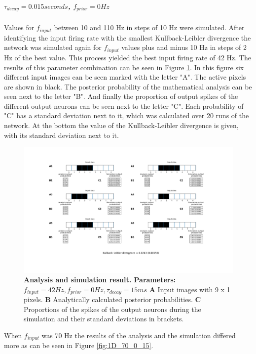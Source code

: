 \subparagraph{$\tau_{decay} = 0.015 seconds$, $f_{prior} = 0 Hz$}
Values for $f_{input}$ between 10 and 110 Hz in steps of 10 Hz were simulated. After identifying the input firing rate with the smallest Kullback-Leibler divergence the network was simulated again for $f_{input}$ values plus and minus 10 Hz in steps of 2 Hz of the best value. This process yielded the best input firing rate of 42 Hz. The results of this parameter combination can be seen in Figure \ref{fig:1D_42_0_15}. In this figure six different input images can be seen marked with the letter "A". The active pixels are shown in black.  The posterior probability of the mathematical analysis can be seen next to the letter "B". And finally the proportion of output spikes of the different output neurons can be seen next to the letter "C". Each probability of "C" has a standard deviation next to it, which was calculated over 20 runs of the network. At the bottom the value of the Kullback-Leibler divergence is given, with its standard deviation next to it.

\begin{figure}
  \includegraphics[width=\linewidth]{figures/1D/1D_42_0_15.png}
  \caption{\textbf{Analysis and simulation result. Parameters: } $f_{input} = 42 Hz, f_{prior} = 0 Hz, \tau_{decay} = 15 ms$ \textbf{A} Input images with 9 x 1 pixels. \textbf{B} Analytically calculated posterior probabilities. \textbf{C} Proportions of the spikes of the output neurons during the simulation and their standard deviations in brackets.}
  \label{fig:1D_42_0_15}
\end{figure}

When $f_{input}$ was 70 Hz the results of the analysis and the simulation differed more as can be seen in Figure \ref{fig:1D_70_0_15}.

